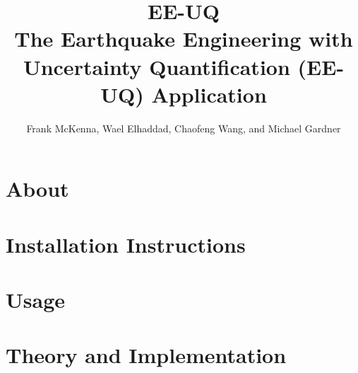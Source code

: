 \documentclass{simcenterdocumentation}
\begin{document}
\title{EE-UQ\\ \Large The Earthquake Engineering with Uncertainty Quantification (EE-UQ) Application}
\author{Frank McKenna, Wael Elhaddad, Chaofeng Wang, and Michael Gardner}

\hypersetup{pageanchor=false}
\maketitle
\copyrightpage
\acknowledgments

\hypersetup{pageanchor=true}
\begin{frontmatter}

\pagestyle{plain}
{
  \renewcommand{\thispagestyle}[1]{}
  \tableofcontents
  \clearpage
  \listoffigures
  \clearpage
  \listoftables
}

\end{frontmatter}
\pagestyle{somewhatsimple}

\chapter{About}
\label{chap:about}


\chapter{Installation Instructions}
\label{chap:installation}



\chapter{Usage}
\label{chap:usage}


\chapter{Theory and Implementation}
\label{chap:theory}

\end{document}
